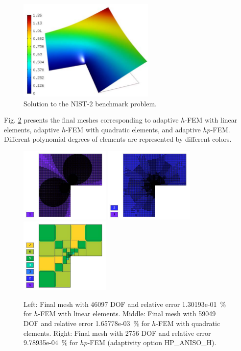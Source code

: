 \documentclass[12pt]{elsarticle}
\begin{document}
\begin{figure}[H]
\centering
\vspace{-1mm}
\includegraphics[height=5cm]{mafig7.pdf}
\vspace{-1mm}
\caption{Solution to the NIST-2 benchmark problem.}
\label{fig:sln-nist02}
\end{figure}

Fig. \ref{fig:nist-2-hp-aniso} presents the final meshes corresponding to adaptive $h$-FEM with
linear elements, adaptive $h$-FEM with quadratic elements, and adaptive $hp$-FEM. Different
polynomial degrees of elements are represented by different colors.

\begin{figure}[H]
\centering
\vspace{-2mm}
\includegraphics[height=3.7cm]{mafig8.pdf}
\includegraphics[height=3.7cm]{mafig9.pdf}
\includegraphics[height=3.7cm]{mafig10.pdf}
\vspace{-2mm}
\caption{
Left: Final mesh with 46097 DOF and relative error 1.30193e-01~\% for $h$-FEM with linear elements.
Middle: Final mesh with 59049 DOF and relative error 1.65778e-03~\% for $h$-FEM with quadratic elements.
Right: Final mesh with 2756 DOF and relative error 9.78935e-04~\% for $hp$-FEM (adaptivity option HP\_ANISO\_H).}
\label{fig:nist-2-hp-aniso}
\vspace{-2mm}
\end{figure}
\end{document}
